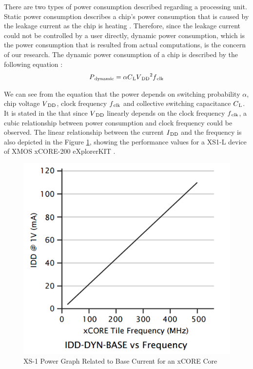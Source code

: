 There are two types of power consumption described regarding a processing unit. Static power consumption describes a chip's power consumption that is caused by the leakage current as the chip is heating \cite{springerparallel}. Therefore, since the leakage current could not be controlled by a user directly, dynamic power consumption, which is the power consumption that is resulted from actual computations, is the concern of our research. The dynamic power consumption of a chip is described by the following equation \cite{dvfspaper}: 
\begin{equation} \label{dyneq}
P\textsubscript{dynamic} = {\alpha} {C\textsubscript{L}} {V\textsubscript{DD}\textsuperscript{2}} {f\textsubscript{clk}}
\end{equation}

We can see from the equation that the power depends on switching probability ${\alpha}$, chip voltage ${V\textsubscript{DD}}$, clock frequency ${f\textsubscript{clk}}$ and collective switching capacitance ${C\textsubscript{L}}$. It is stated in the \cite{springerparallel} that since ${V\textsubscript{DD}}$ linearly depends on the clock frequency ${f\textsubscript{clk}}$, a cubic relationship between power consumption and clock frequency could be observed. The linear relationship between the current ${I\textsubscript{DD}}$ and the frequency is also depicted in the Figure \ref{fig:xs1energy}, showing the performance values for a XS1-L device of XMOS xCORE-200 eXplorerKIT \cite{xs1energymanual}.

\begin{figure}[!ht]
	\centering
	\includegraphics[scale=0.5]{content/images/xs1energy.png}
	\caption{XS-1 Power Graph Related to Base Current for an xCORE Core}
	\label{fig:xs1energy}
\end{figure}

